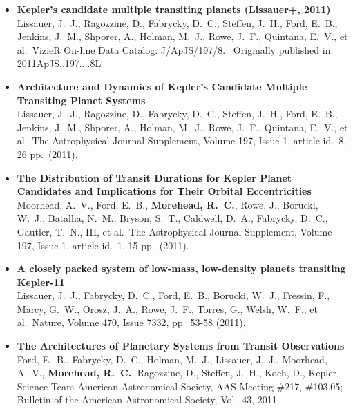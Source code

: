 \documentclass[12pt,letterpaper,sans]{moderncv} %
\begin{document}
\begin{itemize}
 \item \textbf{ Kepler's candidate multiple transiting planets (Lissauer+, 
2011) } \\ Lissauer, J.~J., Ragozzine, D., Fabrycky, D.~C., Steffen, J.~H., 
Ford, E.~B., Jenkins, J.~M., Shporer, A., Holman, M.~J., Rowe, J.~F., 
Quintana, E.~V., et al.\ VizieR On-line Data Catalog: J/ApJS/197/8.~ 
Originally published in: 2011ApJS..197....8L \\ 

 \item \textbf{ Architecture and Dynamics of Kepler's Candidate Multiple 
Transiting Planet Systems } \\ Lissauer, J.~J., Ragozzine, D., Fabrycky, 
D.~C., Steffen, J.~H., Ford, E.~B., Jenkins, J.~M., Shporer, A., Holman, 
M.~J., Rowe, J.~F., Quintana, E.~V., et al.\ The Astrophysical Journal 
Supplement, Volume 197, Issue 1, article id.~8, 26 pp.~(2011).\ \\ 

 \item \textbf{ The Distribution of Transit Durations for Kepler Planet 
Candidates and Implications for Their Orbital Eccentricities } \\ Moorhead, 
A.~V., Ford, E.~B., \textbf{Morehead, R.~C.}, Rowe, J., Borucki, W.~J., Batalha, 
N.~M., Bryson, S.~T., Caldwell, D.~A., Fabrycky, D.~C., Gautier, T.~N., 
III, et al.\ The Astrophysical Journal Supplement, Volume 197, Issue 1, 
article id.~1, 15 pp.~(2011).\ \\ 

 \item \textbf{ A closely packed system of low-mass, low-density planets 
transiting Kepler-11 } \\ Lissauer, J.~J., Fabrycky, D.~C., Ford, E.~B., 
Borucki, W.~J., Fressin, F., Marcy, G.~W., Orosz, J.~A., Rowe, J.~F., 
Torres, G., Welsh, W.~F., et al.\ Nature, Volume 470, Issue 7332, pp.~53-58 
(2011).\ \\ 


 \item \textbf{ The Architectures of Planetary Systems from Transit 
Observations } \\ Ford, E.~B., Fabrycky, D.~C., Holman, M.~J., Lissauer, 
J.~J., Moorhead, A.~V., \textbf{Morehead, R.~C.}, Ragozzine, D., Steffen, J.~H., 
Koch, D., Kepler Science Team American Astronomical Society, AAS Meeting 
\#217, \#103.05; Bulletin of the American Astronomical Society, Vol.~43, 
2011 \\ 


\end{itemize}
\end{document}
